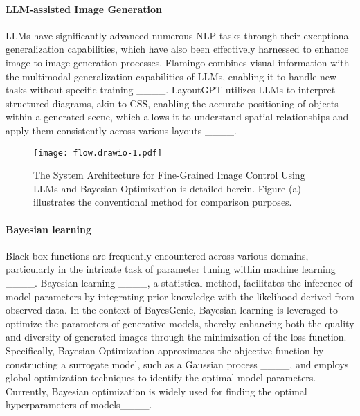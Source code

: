 \paragraph{LLM-assisted Image Generation}
LLMs have significantly advanced numerous NLP tasks through their exceptional generalization capabilities, which have also been effectively harnessed to enhance image-to-image generation processes. Flamingo combines visual information with the multimodal generalization capabilities of LLMs, enabling it to handle new tasks without specific training ____. LayoutGPT utilizes LLMs to interpret structured diagrams, akin to CSS, enabling the accurate positioning of objects within a generated scene, which allows it to understand spatial relationships and apply them consistently across various layouts ____. 


\begin{figure*}[ht]
    \centering
    \texttt{[image: flow.drawio-1.pdf]}
    \caption{The System Architecture for Fine-Grained Image Control Using LLMs and Bayesian Optimization is detailed herein. Figure (a) illustrates the conventional method for comparison purposes.}
    \label{fig:flow}
\end{figure*}
 

\paragraph{Bayesian learning}
Black-box functions are frequently encountered across various domains, particularly in the intricate task of parameter tuning within machine learning ____. Bayesian learning ____, a statistical method, facilitates the inference of model parameters by integrating prior knowledge with the likelihood derived from observed data. In the context of BayesGenie, Bayesian learning is leveraged to optimize the parameters of generative models, thereby enhancing both the quality and diversity of generated images through the minimization of the loss function. Specifically, Bayesian Optimization approximates the objective function by constructing a surrogate model, such as a Gaussian process ____, and employs global optimization techniques to identify the optimal model parameters. Currently, Bayesian optimization is widely used for finding the optimal hyperparameters of models____.